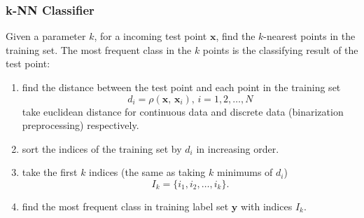 \documentclass[10pt]{article}
\begin{document}
\subsubsection{k-NN Classifier}
Given a parameter $k$, for a incoming test point $\mathbf{x}$, find the $k$-nearest points in the training set. The most frequent class in the $k$ points is the classifying result of the test point:
\begin{enumerate}
\item find the distance between the test point and each point in the training set
$$d_i = \rho\left(\mathbf{x},\, \mathbf{x}_i\right),\, i = 1, 2, \dots, N$$
take euclidean distance for continuous data and discrete data (binarization preprocessing) respectively.
\item sort the indices of the training set by $d_i$ in increasing order.
\item take the first $k$ indices (the same as taking $k$ minimums of $d_i$)
$$I_{k} = \{i_1, i_2, \dots, i_k\}\text{.}$$
\item find the most frequent class in training label set $\mathbf{y}$ with indices $I_k$.
\end{enumerate}
\end{document}
